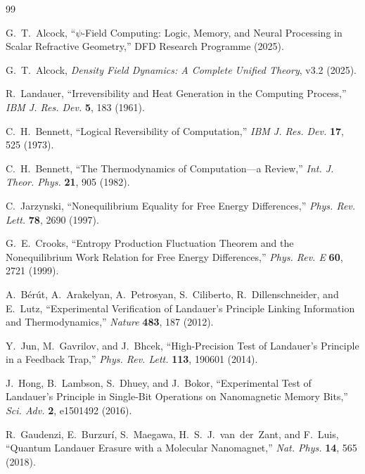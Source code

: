 \documentclass[11pt,twocolumn]{article}
\theoremstyle{definition}
\theoremstyle{remark}
\begin{document}
\begin{thebibliography}{99}

G.~T.~Alcock, ``$\psi$-Field Computing: Logic, Memory, and Neural
Processing in Scalar Refractive Geometry,'' DFD Research Programme (2025).

G.~T.~Alcock, \textit{Density Field Dynamics: A Complete Unified Theory},
v3.2 (2025).

R.~Landauer, ``Irreversibility and Heat Generation in the Computing
Process,'' \textit{IBM J. Res. Dev.} \textbf{5}, 183 (1961).

C.~H.~Bennett, ``Logical Reversibility of Computation,''
\textit{IBM J. Res. Dev.} \textbf{17}, 525 (1973).

C.~H.~Bennett, ``The Thermodynamics of Computation---a Review,''
\textit{Int. J. Theor. Phys.} \textbf{21}, 905 (1982).

C.~Jarzynski, ``Nonequilibrium Equality for Free Energy Differences,''
\textit{Phys. Rev. Lett.} \textbf{78}, 2690 (1997).

G.~E.~Crooks, ``Entropy Production Fluctuation Theorem and the
Nonequilibrium Work Relation for Free Energy Differences,''
\textit{Phys. Rev. E} \textbf{60}, 2721 (1999).

A.~B\'er\'ut, A.~Arakelyan, A.~Petrosyan, S.~Ciliberto, R.~Dillenschneider,
and E.~Lutz, ``Experimental Verification of Landauer's Principle Linking
Information and Thermodynamics,'' \textit{Nature} \textbf{483}, 187 (2012).

Y.~Jun, M.~Gavrilov, and J.~Bhcek, ``High-Precision Test of Landauer's
Principle in a Feedback Trap,'' \textit{Phys. Rev. Lett.} \textbf{113},
190601 (2014).

J.~Hong, B.~Lambson, S.~Dhuey, and J.~Bokor, ``Experimental Test of
Landauer's Principle in Single-Bit Operations on Nanomagnetic Memory
Bits,'' \textit{Sci. Adv.} \textbf{2}, e1501492 (2016).

R.~Gaudenzi, E.~Burzur\'{i}, S.~Maegawa, H.~S.~J.~van~der~Zant, and
F.~Luis, ``Quantum Landauer Erasure with a Molecular Nanomagnet,''
\textit{Nat. Phys.} \textbf{14}, 565 (2018).


\end{thebibliography}
\end{document}

